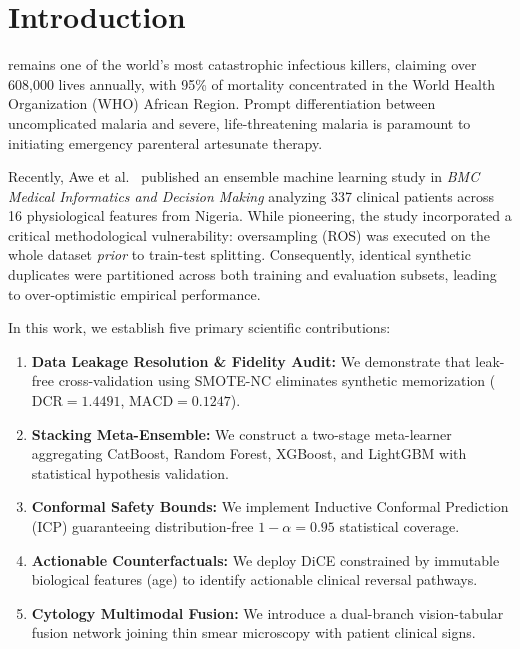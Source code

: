 \documentclass[10pt,journal,compsoc]{IEEEtran}
\begin{document}
\maketitle
\IEEEdisplaynontitleabstractindextext
\IEEEpeerreviewmaketitle

\section{Introduction}
 remains one of the world's most catastrophic infectious killers, claiming over 608,000 lives annually, with 95\% of mortality concentrated in the World Health Organization (WHO) African Region. Prompt differentiation between uncomplicated malaria and severe, life-threatening malaria is paramount to initiating emergency parenteral artesunate therapy.

Recently, Awe et al.~\cite{awe2025explainable} published an ensemble machine learning study in \textit{BMC Medical Informatics and Decision Making} analyzing 337 clinical patients across 16 physiological features from Nigeria. While pioneering, the study incorporated a critical methodological vulnerability: oversampling (ROS) was executed on the whole dataset \textit{prior} to train-test splitting. Consequently, identical synthetic duplicates were partitioned across both training and evaluation subsets, leading to over-optimistic empirical performance.

In this work, we establish five primary scientific contributions:
\begin{enumerate}
    \item \textbf{Data Leakage Resolution \& Fidelity Audit:} We demonstrate that leak-free cross-validation using SMOTE-NC eliminates synthetic memorization ($\text{DCR} = 1.4491$, $\text{MACD} = 0.1247$).
    \item \textbf{Stacking Meta-Ensemble:} We construct a two-stage meta-learner aggregating CatBoost, Random Forest, XGBoost, and LightGBM with statistical hypothesis validation.
    \item \textbf{Conformal Safety Bounds:} We implement Inductive Conformal Prediction (ICP) guaranteeing distribution-free $1-\alpha = 0.95$ statistical coverage.
    \item \textbf{Actionable Counterfactuals:} We deploy DiCE constrained by immutable biological features (age) to identify actionable clinical reversal pathways.
    \item \textbf{Cytology Multimodal Fusion:} We introduce a dual-branch vision-tabular fusion network joining thin smear microscopy with patient clinical signs.
\end{enumerate}
\end{document}
